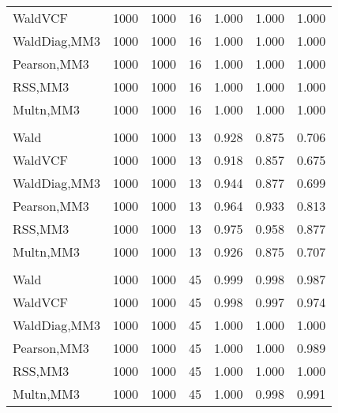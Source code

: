 \documentclass[
]{article}
\begin{document}
\begin{table}[H]
{\begin{tabular}[t]{lrrrrrr}
\hspace{1em}WaldVCF & 1000 & 1000 & 16 & 1.000 & 1.000 & 1.000\\
\hspace{1em}WaldDiag,MM3 & 1000 & 1000 & 16 & 1.000 & 1.000 & 1.000\\
\hspace{1em}Pearson,MM3 & 1000 & 1000 & 16 & 1.000 & 1.000 & 1.000\\
\hspace{1em}RSS,MM3 & 1000 & 1000 & 16 & 1.000 & 1.000 & 1.000\\
\hspace{1em}Multn,MM3 & 1000 & 1000 & 16 & 1.000 & 1.000 & 1.000\\
\addlinespace[0.3em]
\multicolumn{7}{l}{\textbf{2F 10V}}\\
\hspace{1em}Wald & 1000 & 1000 & 13 & 0.928 & 0.875 & 0.706\\
\hspace{1em}WaldVCF & 1000 & 1000 & 13 & 0.918 & 0.857 & 0.675\\
\hspace{1em}WaldDiag,MM3 & 1000 & 1000 & 13 & 0.944 & 0.877 & 0.699\\
\hspace{1em}Pearson,MM3 & 1000 & 1000 & 13 & 0.964 & 0.933 & 0.813\\
\hspace{1em}RSS,MM3 & 1000 & 1000 & 13 & 0.975 & 0.958 & 0.877\\
\hspace{1em}Multn,MM3 & 1000 & 1000 & 13 & 0.926 & 0.875 & 0.707\\
\addlinespace[0.3em]
\multicolumn{7}{l}{\textbf{3F 15V}}\\
\hspace{1em}Wald & 1000 & 1000 & 45 & 0.999 & 0.998 & 0.987\\
\hspace{1em}WaldVCF & 1000 & 1000 & 45 & 0.998 & 0.997 & 0.974\\
\hspace{1em}WaldDiag,MM3 & 1000 & 1000 & 45 & 1.000 & 1.000 & 1.000\\
\hspace{1em}Pearson,MM3 & 1000 & 1000 & 45 & 1.000 & 1.000 & 0.989\\
\hspace{1em}RSS,MM3 & 1000 & 1000 & 45 & 1.000 & 1.000 & 1.000\\
\hspace{1em}Multn,MM3 & 1000 & 1000 & 45 & 1.000 & 0.998 & 0.991\\
\bottomrule
\end{tabular}}
\endgroup{}
\end{table}
\end{document}
